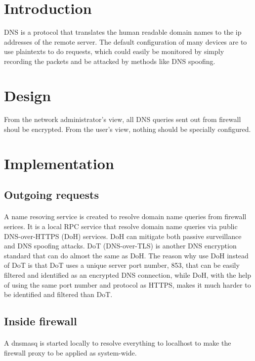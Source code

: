 \documentclass[mscthesis]{usiinfthesis}
\begin{document}
\section{Introduction}
DNS is a protocol that translates the human readable domain names to the ip addresses of the remote server. The default configuration of many devices are to use plaintexts to do requests, which could easily be monitored by simply recording the packets and be attacked by methods like DNS spoofing.

\section{Design}
\paragraph{}
From the network administrator's view, all DNS queries sent out from firewall shoul be encrypted. From the user's view, nothing should be specially configured.

\section{Implementation}
\subsection{Outgoing requests}
\paragraph{}
A name resoving service is created to resolve domain name queries from firewall serices. It is a local RPC service that resolve domain name queries via public DNS-over-HTTPS (DoH) services. DoH can mitigate both passive surveillance and DNS spoofing attacks\citep{rfc:doh8}. DoT (DNS-over-TLS) is another DNS encryption standard that can do almost the same as DoH. The reason why use DoH instead of DoT is that DoT uses a unique server port number, 853, that can be easily filtered and identified as an encrypted DNS connection, while DoH, with the help of using the same port number and protocol as HTTPS, makes it much harder to be identified and filtered than DoT.
\subsection{Inside firewall}
\paragraph{}
A dnsmasq is started locally to resolve everything to localhost to make the firewall proxy to be applied as system-wide.
\end{document}
